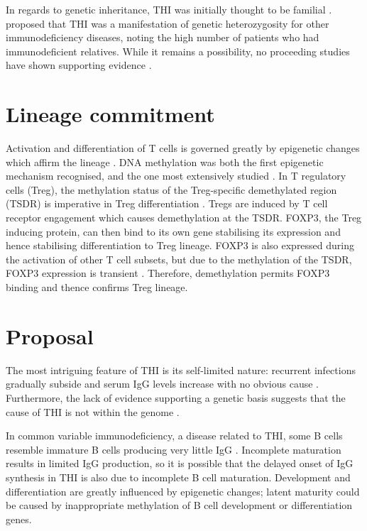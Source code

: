 \documentclass[12pt]{article}
\begin{document}
			In regards to genetic inheritance, THI was initially thought to be familial \citep{Willenbockel60}. 
			\citet{Soothill68} proposed that THI was a manifestation of genetic heterozygosity for other immunodeficiency diseases, noting the high number of patients who had immunodeficient relatives.
			While it remains a possibility, no proceeding studies have shown supporting evidence \citep{Tiller78,Fiorilli86, Ovadia14}.
			
			
	\section{Lineage commitment}

		Activation and differentiation of T cells is governed greatly by epigenetic changes which affirm the lineage \citep{Zeng13}.
		DNA methylation was both the first epigenetic mechanism recognised, and the one most extensively studied \citep{Begin14}. 
		In T regulatory cells (Treg), the methylation status of the Treg-specific demethylated region (TSDR) is imperative in Treg differentiation \citep{Polansky08}.
		Tregs are induced by T cell receptor engagement which causes demethylation at the TSDR.
		FOXP3, the Treg inducing protein, can then bind to its own gene stabilising its expression and hence stabilising differentiation to Treg lineage.
		FOXP3 is also expressed during the activation of other T cell subsets, but due to the methylation of the TSDR, FOXP3 expression is transient \citep{Ohkura13}.
		Therefore, demethylation permits FOXP3 binding and thence confirms Treg lineage.
		
	\section{Proposal}
	
		The most intriguing feature of THI is its self-limited nature: recurrent infections gradually subside and serum IgG levels increase with no obvious cause  \citep{Tiller78,Soothill68,Siegel81,McGeady87,Dressler89,Kowalczyk97,Dalal98}. 
		Furthermore, the lack of evidence supporting a genetic basis suggests that the cause of THI is not within the genome \citep{Tiller78,Fiorilli86,Ovadia14}.
		
		\newpage
		
		In common variable immunodeficiency, a disease related to THI, some B cells resemble immature B cells producing very little IgG \citep{Fiorilli86}. 
		Incomplete maturation results in limited IgG production, so it is possible that the delayed onset of IgG synthesis in THI is also due to incomplete B cell maturation.
		Development and differentiation are greatly influenced by epigenetic changes; latent maturity could be caused by inappropriate methylation of B cell development or differentiation genes. 
\end{document}
